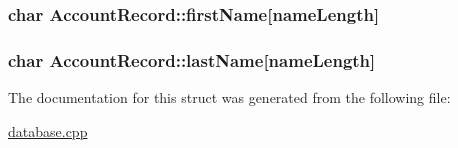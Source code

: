\subsubsection[{\texorpdfstring{first\+Name}{firstName}}]{\setlength{\rightskip}{0pt plus 5cm}char Account\+Record\+::first\+Name\mbox{[}{\bf name\+Length}\mbox{]}}\hypertarget{struct_account_record_a89df48cc152b78efda9060a0cc461dd1}{}\label{struct_account_record_a89df48cc152b78efda9060a0cc461dd1}
\subsubsection[{\texorpdfstring{last\+Name}{lastName}}]{\setlength{\rightskip}{0pt plus 5cm}char Account\+Record\+::last\+Name\mbox{[}{\bf name\+Length}\mbox{]}}\hypertarget{struct_account_record_ab9b4c37852573096dd9c81bec70f68b9}{}\label{struct_account_record_ab9b4c37852573096dd9c81bec70f68b9}


The documentation for this struct was generated from the following file\+:\begin{DoxyCompactItemize}
\item 
\hyperlink{database_8cpp}{database.\+cpp}\end{DoxyCompactItemize}

